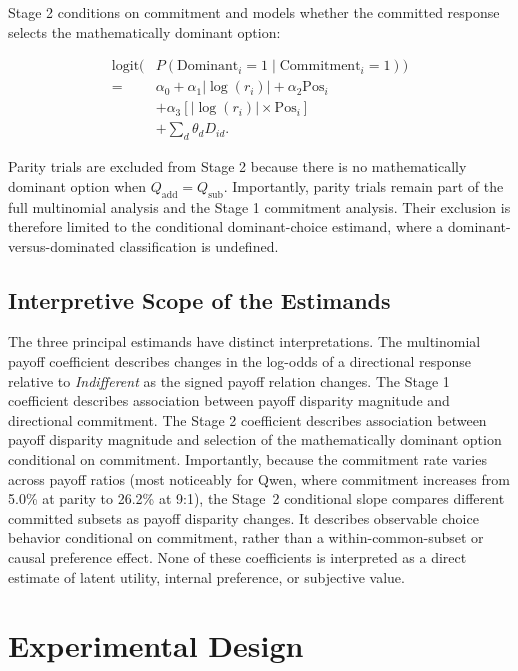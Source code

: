\documentclass[10pt,journal,compsoc]{IEEEtran}
\begin{document}
Stage 2 conditions on commitment and models whether the committed response selects the mathematically dominant option:

\begin{equation}
\begin{aligned}
\text{logit}\!\Big(
&P(\text{Dominant}_i=1\mid\text{Commitment}_i=1)
\Big) \\
={}& \alpha_0+\alpha_1|\log(r_i)|
+\alpha_2\text{Pos}_i \\
&+\alpha_3[|\log(r_i)|\times\text{Pos}_i] \\
&+\sum_{d}\theta_d D_{id}.
\end{aligned}
\end{equation}

Parity trials are excluded from Stage 2 because there is no mathematically dominant option when $Q_{\mathrm{add}}=Q_{\mathrm{sub}}$. Importantly, parity trials remain part of the full multinomial analysis and the Stage 1 commitment analysis. Their exclusion is therefore limited to the conditional dominant-choice estimand, where a dominant-versus-dominated classification is undefined.

\subsection{Interpretive Scope of the Estimands}
The three principal estimands have distinct interpretations. The multinomial payoff coefficient describes changes in the log-odds of a directional response relative to \textit{Indifferent} as the signed payoff relation changes. The Stage 1 coefficient describes association between payoff disparity magnitude and directional commitment. The Stage 2 coefficient describes association between payoff disparity magnitude and selection of the mathematically dominant option conditional on commitment. Importantly, because the commitment rate varies across payoff ratios (most noticeably for Qwen, where commitment increases from 5.0\% at parity to 26.2\% at 9:1), the Stage~2 conditional slope compares different committed subsets as payoff disparity changes. It describes observable choice behavior conditional on commitment, rather than a within-common-subset or causal preference effect. None of these coefficients is interpreted as a direct estimate of latent utility, internal preference, or subjective value.

\section{Experimental Design}
\label{sec:methods}
\end{document}
